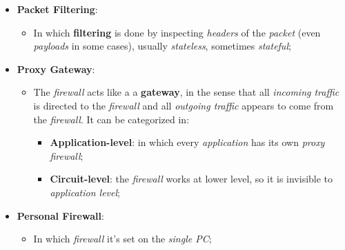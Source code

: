 \documentclass{article}
\begin{document}
\begin{itemize}
\item \textbf{Packet Filtering}:
\begin{itemize}
\item In which \textbf{filtering} is done by inspecting \emph{headers} of the \emph{packet} (even \emph{payloads} in some cases), usually \emph{stateless}, sometimes \emph{stateful}; 
\end{itemize}
\item \textbf{Proxy Gateway}:
\begin{itemize}
\item The \emph{firewall} acts like a a \textbf{gateway}, in the sense that all \emph{incoming traffic} is directed to the \emph{firewall} and all \emph{outgoing traffic} appears to come from the \emph{firewall}. It can be categorized in:
\begin{itemize}
\item \textbf{Application-level}: in which every \emph{application} has its own \emph{proxy firewall};
\item \textbf{Circuit-level}: the \emph{firewall} works at lower level, so it is invisible to \emph{application level};
\end{itemize}
\end{itemize}
\item \textbf{Personal Firewall}:
\begin{itemize}
\item In which \emph{firewall} it's set on the \emph{single PC};
\end{itemize}
\end{itemize}
\end{document}
